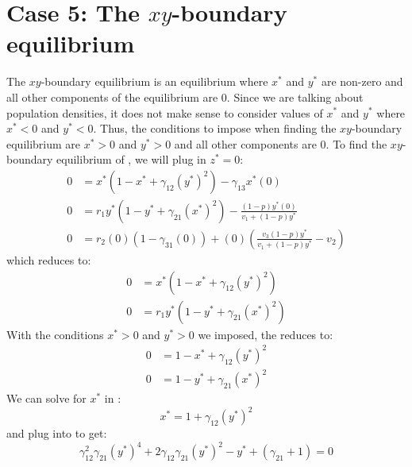 \section{Case 5: The $xy$-boundary equilibrium}\label{sec:xy_boundary_equilibrium}
The $xy$-boundary equilibrium is an equilibrium where $x^*$ and $y^*$ are non-zero and all other components of the equilibrium are 0. Since we are talking about population densities, it does not make sense to consider values of $x^*$ and $y^*$ where $x^*<0$ and $y^*<0$. Thus, the conditions to impose when finding the $xy$-boundary equilibrium are $x^*>0$ and $y^*>0$ and all other components are 0. To find the $xy$-boundary equilibrium of , we will plug in $z^*=0$:
\begin{align*}
    0 &= x^*\left(1-x^*+\gamma_{12}\left(y^*\right)^2\right)-\gamma_{13}x^*(0)\\
    0 &= r_1y^*\left(1-y^*+\gamma_{21}\left(x^*\right)^2\right)-\frac{\left(1-p\right)y^*(0)}{v_1+\left(1-p\right)y^*}\\
    0 &= r_2(0)\left(1-\gamma_{31}(0)\right)+(0)\left(\frac{v_3\left(1-p\right)y^*}{v_1+\left(1-p\right)y^*}-v_2\right)
\end{align*}
which reduces to:
\begin{subequations}
    \begin{align}
        0 &= x^*\left(1-x^*+\gamma_{12}\left(y^*\right)^2\right)
        \label{eq:4.5a}\\
        0 &= r_1y^*\left(1-y^*+\gamma_{21}\left(x^*\right)^2\right)
        \label{eq:4.5b}
    \end{align}
    \label{eq:4.5}
\end{subequations}
With the conditions $x^*>0$ and $y^*>0$ we imposed, the  reduces to:
\begin{subequations}
    \begin{align}
        0 &= 1-x^*+\gamma_{12}\left(y^*\right)^2
        \label{eq:4.6a}\\
        0 &= 1-y^*+\gamma_{21}\left(x^*\right)^2
        \label{eq:4.6b}
    \end{align}
    \label{eq:4.6}
\end{subequations}
We can solve for $x^*$ in :
\begin{equation}
    x^*=1+\gamma_{12}\left(y^*\right)^2
    \label{eq:4.7}
\end{equation}
and plug  into  to get:
\begin{equation}
    \gamma_{12}^2\gamma_{21}\left(y^*\right)^4+2\gamma_{12}\gamma_{21}\left(y^*\right)^2-y^*+\left(\gamma_{21}+1\right)=0
    \label{eq:4.8}
\end{equation}
